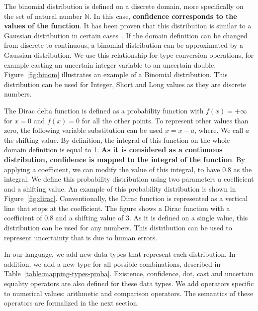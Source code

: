 The binomial distribution is defined on a discrete domain, more specifically on the set of natural number $\mathds{N}$.
In this case, \textbf{confidence corresponds to the values of the function}.
It has been proven that this distribution is similar to a Gaussian distribution in certain cases~\cite{box2005}.
If the domain definition can be changed from discrete to continuous, a binomial distribution can be approximated by a Gaussian distribution. 
We use this relationship for type conversion operations, for example casting an uncertain integer variable to an uncertain double.
Figure~\ref{fig:binom} illustrates an example of a Binomial distribution.
This distribution can be used for Integer, Short and Long values as they are discrete numbers.

The Dirac delta function is defined as a probability function with $f(x) = +\infty$ for $x=0$ and $f(x) = 0$ for all the other points.
To represent other values than zero, the following variable substitution can be used $x = x - a$,  where.
We call $a$ the shifting value.
By definition, the integral of this function on the whole domain definition is equal to 1.
\textbf{As it is considered as a continuous distribution, confidence is mapped to the integral of the function}.
By applying a coefficient, we can modify the value of this integral, \eg to have 0.8 as the integral.
We define this probability distribution using two parameters a coefficient and a shifting value.
An example of this probability distribution is shown in Figure~\ref{fig:dirac}.
Conventionally, the Dirac function is represented as a vertical line that stops at the coefficient.
The figure shows a Dirac function with a coefficient of 0.8 and a shifting value of 3.
As it is defined on a single value, this distribution can be used for any numbers.
This distribution can be used to represent uncertainty that is due to human errors.

In our language, we add new data types that represent each distribution.
In addition, we add a new type for all possible combinations, described in Table~\ref{table:mapping-types-proba}.
Existence, confidence, dot, cast and uncertain equality operators are also defined for these data types.
We add operators specific to numerical values: arithmetic and comparison operators.
The semantics of these operators are formalized in the next section.	


